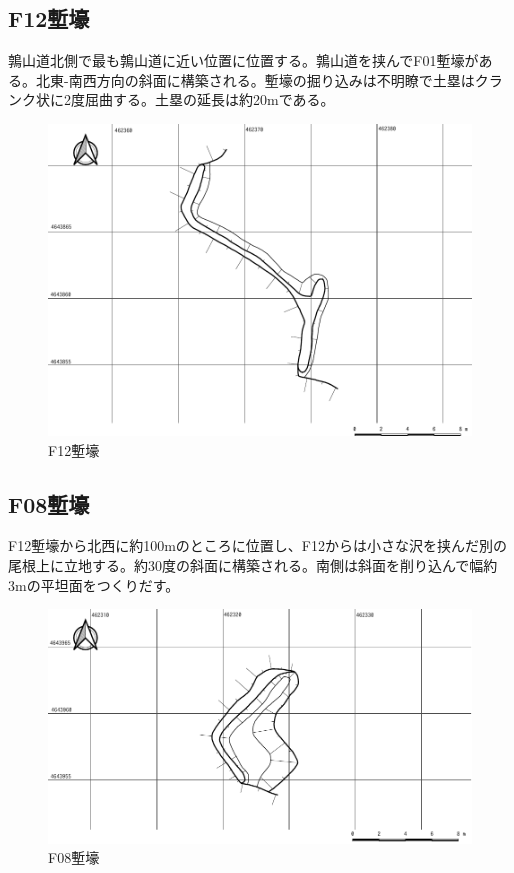\documentclass[14Q]{jsarticle}
\begin{document}
\subsection{F12塹壕}
鶉山道北側で最も鶉山道に近い位置に位置する。鶉山道を挟んでF01塹壕がある。北東-南西方向の斜面に構築される。塹壕の掘り込みは不明瞭で土塁はクランク状に2度屈曲する。土塁の延長は約20mである。

\begin{figure}[h]
\centering
\includegraphics[width=160truemm]{fig/F12.pdf}
\caption{F12塹壕}
\label{f12}
\end{figure}

\subsection{F08塹壕}
F12塹壕から北西に約100mのところに位置し、F12からは小さな沢を挟んだ別の尾根上に立地する。約30度の斜面に構築される。南側は斜面を削り込んで幅約3mの平坦面をつくりだす。

\begin{figure}[h]
\centering
\includegraphics[width=160truemm]{fig/F08.pdf}
\caption{F08塹壕}
\label{f08}
\end{figure}
\end{document}
